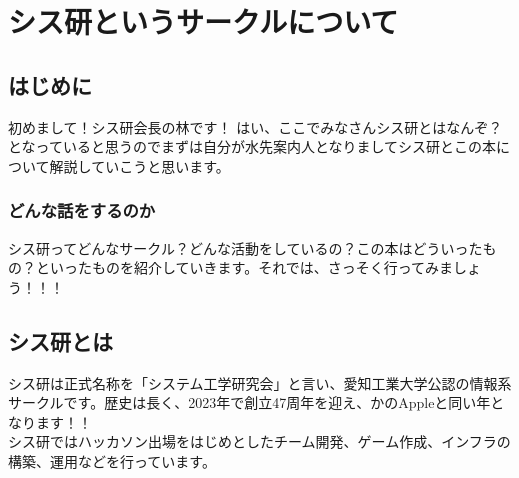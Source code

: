 \chapter{シス研というサークルについて}

\section{はじめに}
初めまして！シス研会長の林です！
はい、ここでみなさんシス研とはなんぞ？となっていると思うのでまずは自分が水先案内人となりましてシス研とこの本について解説していこうと思います。

\subsection{どんな話をするのか}
シス研ってどんなサークル？どんな活動をしているの？この本はどういったもの？といったものを紹介していきます。それでは、さっそく行ってみましょう！！！

\section{シス研とは}
シス研は正式名称を「システム工学研究会」と言い、愛知工業大学公認の情報系サークルです。歴史は長く、2023年で創立47周年を迎え、かのAppleと同い年となります！！ \\
シス研ではハッカソン出場をはじめとしたチーム開発、ゲーム作成、インフラの構築、運用などを行っています。

